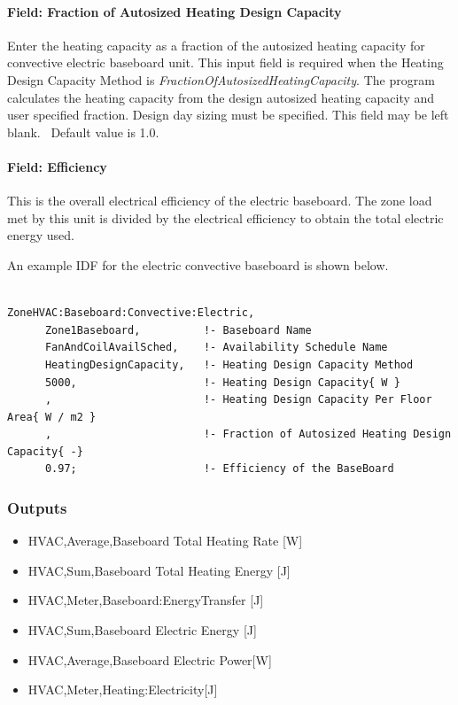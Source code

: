 \paragraph{Field: Fraction of Autosized Heating Design Capacity}\label{field-fraction-of-autosized-heating-design-capacity-4}

Enter the heating capacity as a fraction of the autosized heating capacity for convective electric baseboard unit. This input field is required when the Heating Design Capacity Method is \emph{FractionOfAutosizedHeatingCapacity}. The program calculates the heating capacity from the design autosized heating capacity and user specified fraction. Design day sizing must be specified. This field may be left blank.~ Default value is 1.0.

\paragraph{Field: Efficiency}\label{field-efficiency-1}

This is the overall electrical efficiency of the electric baseboard. The zone load met by this unit is divided by the electrical efficiency to obtain the total electric energy used.

An example IDF for the electric convective baseboard is shown below.

\begin{lstlisting}

ZoneHVAC:Baseboard:Convective:Electric,
      Zone1Baseboard,          !- Baseboard Name
      FanAndCoilAvailSched,    !- Availability Schedule Name
      HeatingDesignCapacity,   !- Heating Design Capacity Method
      5000,                    !- Heating Design Capacity{ W }
      ,                        !- Heating Design Capacity Per Floor Area{ W / m2 }
      ,                        !- Fraction of Autosized Heating Design Capacity{ -}
      0.97;                    !- Efficiency of the BaseBoard
\end{lstlisting}

\subsubsection{Outputs}\label{outputs-4-012}

\begin{itemize}
\item
  HVAC,Average,Baseboard Total Heating Rate {[}W{]}
\item
  HVAC,Sum,Baseboard Total Heating Energy {[}J{]}
\item
  HVAC,Meter,Baseboard:EnergyTransfer {[}J{]}
\item
  HVAC,Sum,Baseboard Electric Energy {[}J{]}
\item
  HVAC,Average,Baseboard Electric Power{[}W{]}
\item
  HVAC,Meter,Heating:Electricity{[}J{]}
\end{itemize}

